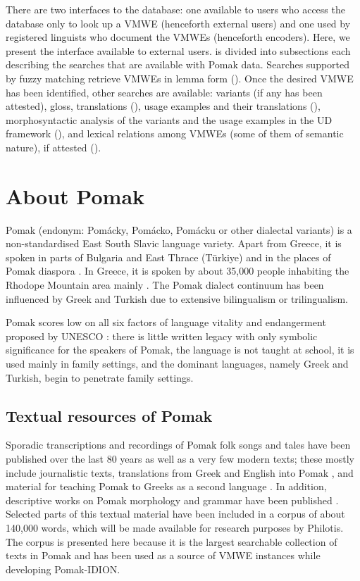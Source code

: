 \documentclass[output=paper,colorlinks,citecolor=brown]{langscibook}
\begin{document}
There are two interfaces to the database: one available to users who access the database only to look up a VMWE (henceforth external users) and one used by registered linguists who document the VMWEs (henceforth encoders). Here, we present the interface available to external users.  is divided into subsections each describing the searches that are available with Pomak data. Searches supported by fuzzy matching retrieve VMWEs in lemma form (). Once the desired VMWE has been identified, other searches are available: variants (if any has been attested), gloss, translations (), usage examples and their translations (), morphosyntactic analysis of the variants and the usage examples in the UD framework (), and lexical relations among VMWEs (some of them of semantic nature), if attested (). 




\section{About Pomak}
\label{sec:aboutpomak}

Pomak (endonym: Pomácky, Pomácko, Pomácku or other dialectal variants)  is a non-standardised East South Slavic language variety. Apart from Greece, it is spoken in parts of Bulgaria and East Thrace (Türkiye) and in the places of Pomak diaspora \citep[35]{Constantinides}. In Greece, it is spoken by about 35,000 people inhabiting the Rhodope Mountain area mainly  \citep{adamou}. The Pomak dialect continuum has been influenced by Greek and Turkish due to extensive bilingualism or trilingualism.

Pomak scores low on all six factors of language vitality and endangerment proposed by UNESCO \citep{unesco}: there is little written legacy with only symbolic significance for the speakers of Pomak, the language is not taught at school, it is used mainly in family settings, and the dominant languages, namely Greek and Turkish, begin to penetrate family settings.

\subsection{Textual resources of Pomak}
\label{sec:sourcepomak}

Sporadic transcriptions and recordings of Pomak folk songs and tales have been published over the last 80 years \citep{theocharidisg,theocharidisl}  as well as a very few modern texts; these mostly include journalistic texts, translations from Greek and English into Pomak \citep{sebatr}, and material for teaching Pomak to Greeks as a second language \citep{kokkas}. 
In addition, descriptive works on Pomak morphology and grammar have been published \citep{papadimitrioudial,papadimitrioudiap,sandry}. 
 Selected parts of this textual material have been included in a corpus of about 140,000 words, which will be made available for research purposes by Philotis. The corpus is presented here because it is the largest searchable collection of texts in Pomak and has been used as a source of VMWE instances while developing Pomak-IDION.
\end{document}
